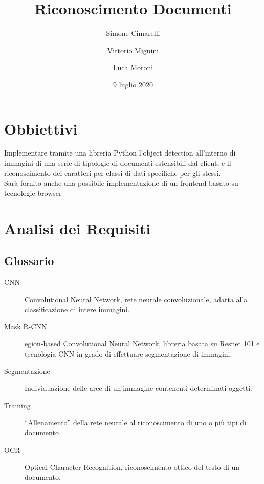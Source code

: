 \documentclass[12pt,A4]{article}
\begin{document}
\title{Riconoscimento Documenti}
\author{Simone Cimarelli \and Vittorio Mignini \and Luca Moroni}
\date{9 luglio 2020}

\maketitle

\begin{abstract}
\end{abstract}

\section{Obbiettivi}

Implementare tramite una libreria Python l'object detection all'interno
di immagini di una serie di tipologie di documenti estensibili dal
client, e il riconoscimento dei caratteri per classi di dati specifiche
per gli stessi.\\
Sarà fornito anche una possibile implementazione di un frontend basato
su tecnologie browser

\section{Analisi dei Requisiti}
\subsection{Glossario}

\begin{description}
    \item[\textsc{CNN}] Convolutional Neural Network, rete neurale
        convoluzionale, adatta alla classificazione di intere immagini.

    \item[Mask \textsc{R-CNN}] egion-based Convolutional Neural Network,
        libreria basata su Resnet 101 e tecnologia \textsc{CNN} in grado
        di effettuare segmentazione di immagini.

    \item[Segmentazione] Individuazione delle aree di un'immagine
        contenenti determinati oggetti.

    \item[Training] ``Allenamento'' della rete neurale al riconoscimento
        di uno o più tipi di documento

    \item[\textsc{OCR}] Optical Character Recognition, riconoscimento
        ottico del testo di un documento.

\end{description}
\end{document}
